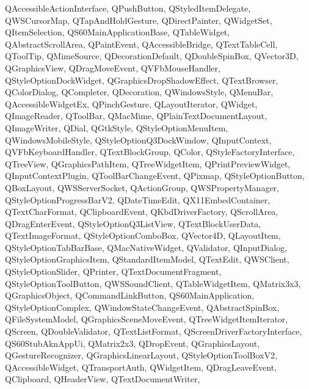 {{    QAccessibleActionInterface,%
    QPushButton,%
    QStyledItemDelegate,%
    QWSCursorMap,%
    QTapAndHoldGesture,%
    QDirectPainter,%
    QWidgetSet,%
    QItemSelection,%
    QS60MainApplicationBase,%
    QTableWidget,%
    QAbstractScrollArea,%
    QPaintEvent,%
    QAccessibleBridge,%
    QTextTableCell,%
    QToolTip,%
    QMimeSource,%
    QDecorationDefault,%
    QDoubleSpinBox,%
    QVector3D,%
    QGraphicsView,%
    QDragMoveEvent,%
    QVFbMouseHandler,%
    QStyleOptionDockWidget,%
    QGraphicsDropShadowEffect,%
    QTextBrowser,%
    QColorDialog,%
    QCompleter,%
    QDecoration,%
    QWindowsStyle,%
    QMenuBar,%
    QAccessibleWidgetEx,%
    QPinchGesture,%
    QLayoutIterator,%
    QWidget,%
    QImageReader,%
    QToolBar,%
    QMacMime,%
    QPlainTextDocumentLayout,%
    QImageWriter,%
    QDial,%
    QGtkStyle,%
    QStyleOptionMenuItem,%
    QWindowsMobileStyle,%
    QStyleOptionQ3DockWindow,%
    QInputContext,%
    QVFbKeyboardHandler,%
    QTextBlockGroup,%
    QColor,%
    QStyleFactoryInterface,%
    QTreeView,%
    QGraphicsPathItem,%
    QTreeWidgetItem,%
    QPrintPreviewWidget,%
    QInputContextPlugin,%
    QToolBarChangeEvent,%
    QPixmap,%
    QStyleOptionButton,%
    QBoxLayout,%
    QWSServerSocket,%
    QActionGroup,%
    QWSPropertyManager,%
    QStyleOptionProgressBarV2,%
    QDateTimeEdit,%
    QX11EmbedContainer,%
    QTextCharFormat,%
    QClipboardEvent,%
    QKbdDriverFactory,%
    QScrollArea,%
    QDragEnterEvent,%
    QStyleOptionQ3ListView,%
    QTextBlockUserData,%
    QTextImageFormat,%
    QStyleOptionComboBox,%
    QVector4D,%
    QLayoutItem,%
    QStyleOptionTabBarBase,%
    QMacNativeWidget,%
    QValidator,%
    QInputDialog,%
    QStyleOptionGraphicsItem,%
    QStandardItemModel,%
    QTextEdit,%
    QWSClient,%
    QStyleOptionSlider,%
    QPrinter,%
    QTextDocumentFragment,%
    QStyleOptionToolButton,%
    QWSSoundClient,%
    QTableWidgetItem,%
    QMatrix3x3,%
    QGraphicsObject,%
    QCommandLinkButton,%
    QS60MainApplication,%
    QStyleOptionComplex,%
    QWindowStateChangeEvent,%
    QAbstractSpinBox,%
    QFileSystemModel,%
    QGraphicsSceneMoveEvent,%
    QTreeWidgetItemIterator,%
    QScreen,%
    QDoubleValidator,%
    QTextListFormat,%
    QScreenDriverFactoryInterface,%
    QS60StubAknAppUi,%
    QMatrix2x3,%
    QDropEvent,%
    QGraphicsLayout,%
    QGestureRecognizer,%
    QGraphicsLinearLayout,%
    QStyleOptionToolBoxV2,%
    QAccessibleWidget,%
    QTransportAuth,%
    QWidgetItem,%
    QDragLeaveEvent,%
    QClipboard,%
    QHeaderView,%
    QTextDocumentWriter,%
}}
